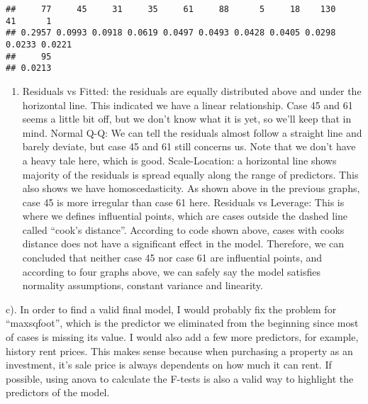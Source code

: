 \documentclass[
]{article}
\providecommand{\tightlist}{%
  \setlength{\itemsep}{0pt}\setlength{\parskip}{0pt}}
\begin{document}
\begin{verbatim}
##     77     45     31     35     61     88      5     18    130     41      1 
## 0.2957 0.0993 0.0918 0.0619 0.0497 0.0493 0.0428 0.0405 0.0298 0.0233 0.0221 
##     95 
## 0.0213
\end{verbatim}

\begin{enumerate}
\def\labelenumi{\alph{enumi})}
\setcounter{enumi}{1}
\tightlist
\item
  Residuals vs Fitted: the residuals are equally distributed above and
  under the horizontal line. This indicated we have a linear
  relationship. Case 45 and 61 seems a little bit off, but we don't know
  what it is yet, so we'll keep that in mind. Normal Q-Q: We can tell
  the residuals almost follow a straight line and barely deviate, but
  case 45 and 61 still concerns us. Note that we don't have a heavy tale
  here, which is good. Scale-Location: a horizontal line shows majority
  of the residuals is spread equally along the range of predictors. This
  also shows we have homoscedasticity. As shown above in the previous
  graphs, case 45 is more irregular than case 61 here. Residuals vs
  Leverage: This is where we defines influential points, which are cases
  outside the dashed line called ``cook's distance''. According to code
  shown above, cases with cooks distance does not have a significant
  effect in the model. Therefore, we can concluded that neither case 45
  nor case 61 are influential points, and according to four graphs
  above, we can safely say the model satisfies normality assumptions,
  constant variance and linearity.
\end{enumerate}

c). In order to find a valid final model, I would probably fix the
problem for ``maxsqfoot'', which is the predictor we eliminated from the
beginning since most of cases is missing its value. I would also add a
few more predictors, for example, history rent prices. This makes sense
because when purchasing a property as an investment, it's sale price is
always dependents on how much it can rent. If possible, using anova to
calculate the F-tests is also a valid way to highlight the predictors of
the model.
\end{document}
